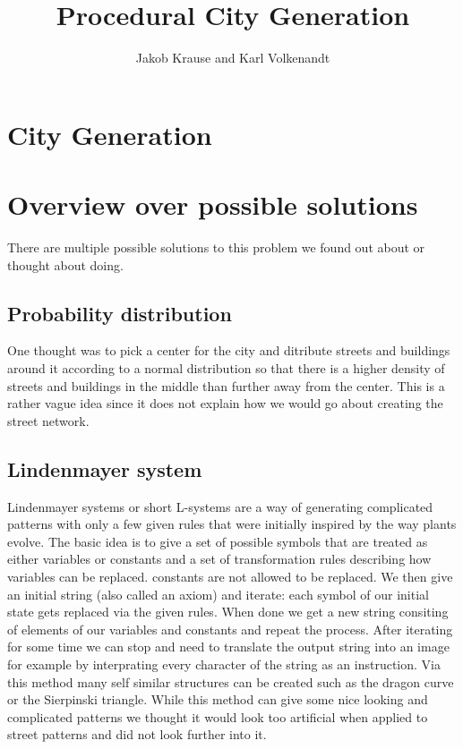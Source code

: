 \documentclass{scrartcl}
\title{Procedural City Generation}
\author{Jakob Krause and Karl Volkenandt}
\begin{document}
\maketitle
\tableofcontents
\newpage


\section{City Generation}



\section{Overview over possible solutions}
There are multiple possible solutions to this problem we found out about or thought
about doing.

\subsection{Probability distribution}
One thought was to pick a center for the city and ditribute streets and buildings
around it according to a normal distribution so that there is a higher density of streets
and buildings in the middle than further away from the center. This is a rather vague
idea since it does not explain how we would go about creating the street network.

\subsection{Lindenmayer system}
Lindenmayer systems or short L-systems are a way of generating complicated patterns
with only a few given rules that were initially inspired by the way plants evolve.
The basic idea is to give a set of possible symbols that are treated as either variables
or constants and a set of transformation rules describing how variables can be replaced.
constants are not allowed to be replaced. We then give an initial string (also
called an axiom) and iterate: each symbol of our initial state gets replaced via the given rules.
When done we get a new string consiting of elements of our variables and constants
and repeat the process. After iterating for some time we can stop and need to
translate the output string into an image for example by interprating every character
of the string as an instruction. Via this method many self similar
structures can be created such as the dragon curve or the Sierpinski triangle.
While this method can give some nice looking and complicated patterns we thought
it would look too artificial when applied to street patterns and did not look further
into it.
\end{document}
